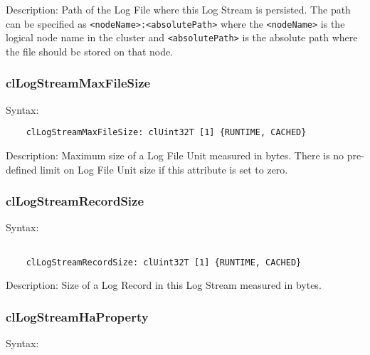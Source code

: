 \begin{flushleft}
\begin{Desc}
\item[Description:]
Path of the Log File where this Log Stream is persisted. The path can be specified as
\newline
{\tt{<nodeName>:<absolutePath>}}
\newline
where the {\tt{<nodeName>}} is the logical node name in the cluster and {\tt{<absolutePath>}} is the absolute path where the file should be 
stored on that node.
\end{Desc}


\subsubsection{clLogStreamMaxFileSize}
\begin{Desc}
\item[Syntax:]
\footnotesize\begin{verbatim}        	
	clLogStreamMaxFileSize: clUint32T [1] {RUNTIME, CACHED}
	\end{verbatim}
	\normalsize
\end{Desc}

\begin{Desc}
\item[Description:]
Maximum size of a Log File Unit measured in bytes. There is no pre-defined limit on
Log File Unit size if this attribute is set to zero.
\end{Desc}


\subsubsection{clLogStreamRecordSize}
\begin{Desc}
\item[Syntax:]

\footnotesize\begin{verbatim}        	

	clLogStreamRecordSize: clUint32T [1] {RUNTIME, CACHED}
	\end{verbatim}
	\normalsize
\end{Desc}
\begin{Desc}
\item[Description:]
Size of a Log Record in this Log Stream measured in bytes.
\end{Desc}


\subsubsection{clLogStreamHaProperty}
\begin{Desc}
\item[Syntax:]
\footnotesize\begin{verbatim}        	


\end{verbatim}
\end{Desc}
\end{flushleft}
